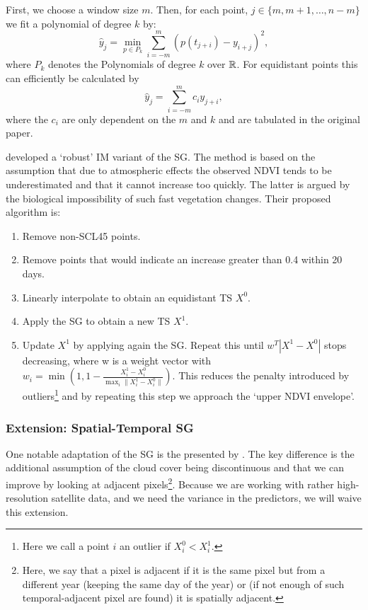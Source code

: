 		First, we choose a window size $m$. Then, for each point, $j \in \{m, m+1, \dots, n-m\}$ we fit a polynomial of degree $k$ by:
		$$\hat y_j=\min_{p\in P_k}\sum_{i=-m}^{m}(p (t_{j+i})-y_{i+j})^{2},$$
		where $P_k$ denotes the Polynomials of degree $k$ over $\mathbb{R}$.
		For equidistant points this can efficiently be calculated by
		$$
			\hat y_{j}=\sum_{i=-m}^{m} c_{i} y_{j+i},
		$$
		where the $c_i$ are only dependent on the $m$ and $k$ and are tabulated in the original paper.

		\cite{chenSimpleMethodReconstructing2004a} developed a `robust' {{IM}} variant of the SG. 
		The method is based on the assumption that due to atmospheric effects the observed NDVI tends to be underestimated and that it cannot increase too quickly. The latter is argued by the biological impossibility of such fast vegetation changes. Their proposed algorithm is:
			\begin{enumerate}
				\item Remove non-SCL45 points.
				\item Remove points that would indicate an increase greater than 0.4 within 20 days.
				\item Linearly interpolate to obtain an equidistant {TS} $X^0$.
				\item Apply the SG to obtain a new {TS} $X^1$.
				\item Update $X^1$ by applying again the SG. Repeat this until $w^T |X^1-X^0|$ stops decreasing, where w is a weight vector with $w_i = \min\left(1, 1 - \frac{X^1_i-X^0_i}{\max_i\|X^1_i-X^0_i\|}\right)$. This reduces the penalty introduced by outliers\footnote{Here we call a point $i$ an outlier if $X^0_i<X^1_i$.} and by repeating this step we approach the `upper NDVI envelope'.
			\end{enumerate}

		\subsubsection*{Extension: Spatial-Temporal SG}
			One notable adaptation of the SG is the presented by \cite{caoSimpleMethodImprove2018b}. The key difference is the additional assumption of the cloud cover being discontinuous and that we can improve by looking at adjacent pixels\footnote{Here, we say that a pixel is adjacent if it is the same pixel but from a different year (keeping the same day of the year) or (if not enough of such temporal-adjacent pixel are found) it is spatially adjacent.}. Because we are working with rather high-resolution satellite data, and we need the variance in the predictors, we will waive this extension.

